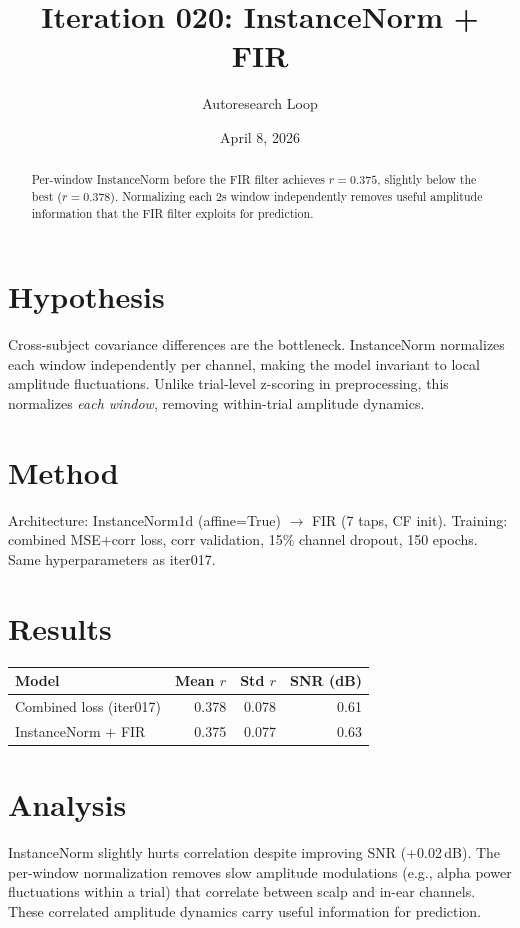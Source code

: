 \documentclass[11pt,a4paper]{article}
\title{Iteration 020: InstanceNorm + FIR}
\author{Autoresearch Loop}
\date{April 8, 2026}
\begin{document}
\maketitle

\begin{abstract}
Per-window InstanceNorm before the FIR filter achieves $r=0.375$, slightly
below the best ($r=0.378$). Normalizing each 2s window independently removes
useful amplitude information that the FIR filter exploits for prediction.
\end{abstract}

\section{Hypothesis}
Cross-subject covariance differences are the bottleneck. InstanceNorm normalizes
each window independently per channel, making the model invariant to local
amplitude fluctuations. Unlike trial-level z-scoring in preprocessing, this
normalizes \emph{each window}, removing within-trial amplitude dynamics.

\section{Method}
Architecture: InstanceNorm1d (affine=True) $\to$ FIR (7 taps, CF init).
Training: combined MSE+corr loss, corr validation, 15\% channel dropout,
150 epochs. Same hyperparameters as iter017.

\section{Results}
\begin{table}[H]
\centering
\begin{tabular}{lrrr}
\toprule
Model & Mean $r$ & Std $r$ & SNR (dB) \\
\midrule
Combined loss (iter017) & 0.378 & 0.078 & 0.61 \\
InstanceNorm + FIR & 0.375 & 0.077 & 0.63 \\
\bottomrule
\end{tabular}
\end{table}

\section{Analysis}
InstanceNorm slightly hurts correlation despite improving SNR (+0.02\,dB). The
per-window normalization removes slow amplitude modulations (e.g., alpha power
fluctuations within a trial) that correlate between scalp and in-ear channels.
These correlated amplitude dynamics carry useful information for prediction.
\end{document}
